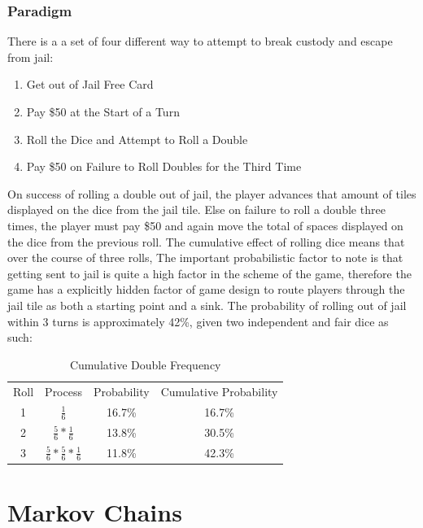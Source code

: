 \documentclass[12pt]{article}
\begin{document}
\subsubsection{Paradigm}
There is a a set of four different way to attempt to break custody and escape from jail:
\begin{enumerate}
  \item {Get out of Jail Free Card}\hfill
  \item {Pay \$50 at the Start of a Turn}\hfill
  \item {Roll the Dice and Attempt to Roll a Double} \hfill
  \item {Pay \$50 on Failure to Roll Doubles for the Third Time} \hfill
\end{enumerate}
On success of rolling a double out of jail, the player advances that amount of tiles displayed on the dice from the jail tile. Else on failure to roll a double three times, the player must pay \$50 and again move the total of spaces displayed on the dice from the previous roll. 
The cumulative effect of rolling dice means that over the course of three rolls, 
The important probabilistic factor to note is that getting sent to jail is quite a high factor in the scheme of the game, therefore the game has a explicitly hidden factor of game design to route players through the jail tile as both a starting point and a sink.
The probability of rolling out of jail within 3 turns is approximately 42\%, given two independent and fair dice as such:
\begin{table}[h]
\centering
\label{Jail Cumulative Probability}
\begin{tabular}{cccc}
Roll & Process              & Probability & Cumulative Probability \\
1    & $\frac{1}{6}$                  & 16.7\%        & 16.7\%                   \\
2    & $\frac{5}{6}*\frac{1}{6}$         & 13.8\%        & 30.5\%                   \\
3    & $\frac{5}{6}*\frac{5}{6}*\frac{1}{6}$ & 11.8\%        & 42.3\%                  
\end{tabular}
\caption{Cumulative Double Frequency}
\end{table}
\section{Markov Chains}
\end{document}
